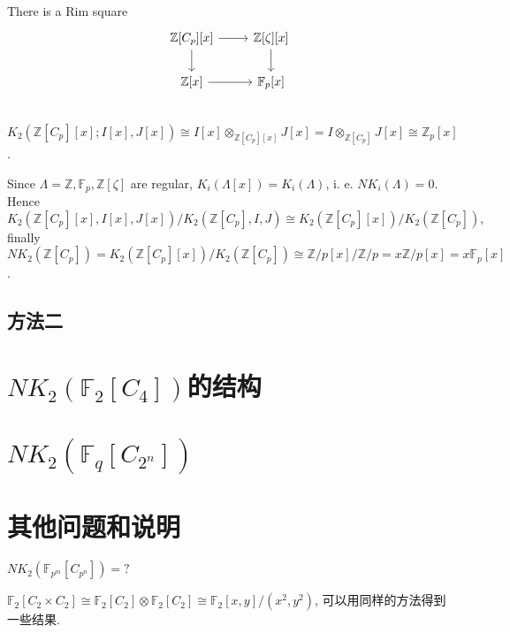 {\begin{example}[{$\mathbb{Z}[C_p]$}]
\end{example}
\begin{example}[{$\mathbb{Z}[C_p][x]$}]
	There is a Rim square
		\[\begin{tikzcd}
			\mathbb{Z}[C_p][x] \ar[r] \ar[d]& \mathbb{Z}[\zeta][x]\ar[d]\\
			\mathbb{Z}[x] \ar[r] & \mathbb{F}_p[x]\\
		\end{tikzcd}\]
$K_2(\mathbb{Z}[C_p][x];I[x], J[x])\cong I[x]\otimes_{\mathbb{Z}[C_p][x]} J[x] =I\otimes_{\mathbb{Z}[C_p]} J[x]\cong \mathbb{Z}_p[x]$. 

Since $\Lambda=\mathbb{Z}, \mathbb{F}_p, \mathbb{Z}[\zeta]$ are regular, $K_i(\Lambda[x]) = K_i(\Lambda)$, i. e. $NK_i(\Lambda)=0$. Hence 
\[K_2(\mathbb{Z}[C_p][x], I[x], J[x])/K_2(\mathbb{Z}[C_p], I, J)\cong K_2(\mathbb{Z}[C_p][x])/K_2(\mathbb{Z}[C_p]), \]
finally $NK_2(\mathbb{Z}[C_p]) = K_2(\mathbb{Z}[C_p][x])/K_2(\mathbb{Z}[C_p]) \cong \mathbb{Z}/p[x]/\mathbb{Z}/p=x \mathbb{Z}/p [x]= x \mathbb{F}_p[x]$. 
\end{example}
}




\subsection{{\color{red}方法二}}




\section{$NK_2(\mathbb{F}_2[C_4])$的结构}




\section{$NK_2(\mathbb{F}_q[C_{2^n}])$} %
\label{sec:NK_2(F_q[C_{2^n}])}




\section{其他问题和说明}

$NK_2(\mathbb{F}_{p^m}[C_{p^n}])=?$

$\mathbb{F}_2[C_2\times C_2] \cong\mathbb{F}_2[C_2]\otimes\mathbb{F}_2[C_2] \cong \mathbb{F}_2[x, y]/(x^2, y^2)$, 可以用同样的方法得到一些结果. 



